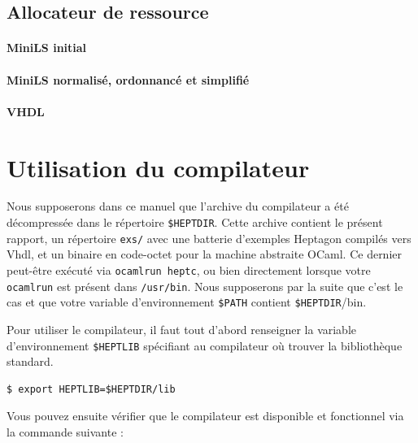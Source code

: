 \documentclass[a4paper]{article}
\newcommand{\LANG}{{\sc Heptagon}}
\newcommand{\vhdl}{{\sc Vhdl}}
\begin{document}
\small

\normalsize

\subsection{Allocateur de ressource}

\paragraph{MiniLS initial}

\small

\normalsize

\paragraph{MiniLS normalis\'e, ordonnanc\'e et simplifi\'e}

\small

\normalsize

\paragraph{VHDL}

\small

\normalsize

\section{Utilisation du compilateur}

Nous supposerons dans ce manuel que l'archive du compilateur a \'et\'e
d\'ecompress\'ee dans le r\'epertoire \verb/$HEPTDIR/. Cette archive contient le
pr\'esent rapport, un r\'epertoire \texttt{exs/} avec une batterie d'exemples
\LANG{} compil\'es vers \vhdl{}, et un binaire en code-octet pour la machine
abstraite OCaml. Ce dernier peut-\^etre ex\'ecut\'e via \texttt{ocamlrun heptc},
ou bien directement lorsque votre \texttt{ocamlrun} est pr\'esent dans
\texttt{/usr/bin}. Nous supposerons par la suite que c'est le cas et que votre
variable d'environnement \verb/$PATH/ contient \verb/$HEPTDIR//bin.

Pour utiliser le compilateur, il faut tout d'abord renseigner la variable
d'environnement \verb/$HEPTLIB/ sp\'ecifiant au compilateur o\`u trouver la
biblioth\`eque standard.

\begin{verbatim}
$ export HEPTLIB=$HEPTDIR/lib
\end{verbatim}

Vous pouvez ensuite v\'erifier que le compilateur est disponible et fonctionnel
via la commande suivante :
\end{document}
